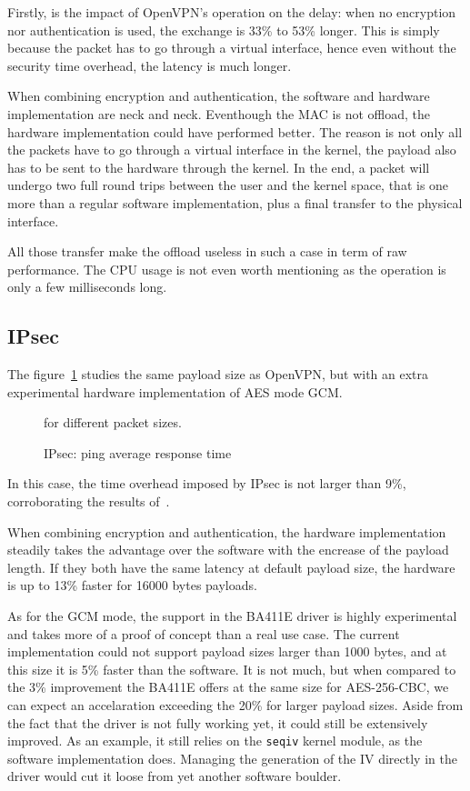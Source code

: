 Firstly, is the impact of OpenVPN's operation on the delay: when no encryption nor authentication is used, the exchange is 33\% to 53\% longer. This is simply because the packet has to go through a virtual interface, hence even without the security time overhead, the latency is much longer.

When combining encryption and authentication, the software and hardware implementation are neck and neck.
Eventhough the MAC is not offload, the hardware implementation could have performed better.
The reason is not only all the packets have to go through a virtual interface in the kernel, the payload also has to be sent to the hardware through the kernel.
In the end, a packet will undergo two full round trips between the user and the kernel space, that is one more than a regular software implementation, plus a final transfer to the physical interface.

\noindent All those transfer make the offload useless in such a case in term of raw performance.
The CPU usage is not even worth mentioning as the operation is only a few milliseconds long.



\subsection{IPsec}
The figure~\ref{fig:ping-benchmark-ipsec} studies the same payload size as OpenVPN, but with an extra experimental hardware implementation of AES mode GCM.

\begin{figure}[ht]

\caption{IPsec: ping average response time}{for different packet sizes.}
\label{fig:ping-benchmark-ipsec}
\end{figure}

In this case, the time overhead imposed by IPsec is not larger than 9\%, corroborating the results of~\citet{Xenakis20063225}.

When combining encryption and authentication, the hardware implementation steadily takes the advantage over the software with the encrease of the payload length.
If they both have the same latency at default payload size, the hardware is up to 13\% faster for 16000 bytes payloads.

As for the GCM mode, the support in the BA411E driver is highly experimental and takes more of a proof of concept than a real use case.
The current implementation could not support payload sizes larger than 1000 bytes, and at this size it is 5\% faster than the software.
It is not much, but when compared to the 3\% improvement the BA411E offers at the same size for AES-256-CBC, we can expect an accelaration exceeding the 20\% for larger payload sizes. %
Aside from the fact that the driver is not fully working yet, it could still be extensively improved.
As an example, it still relies on the \texttt{seqiv} kernel module, as the software implementation does.
Managing the generation of the IV directly in the driver would cut it loose from yet another software boulder.



